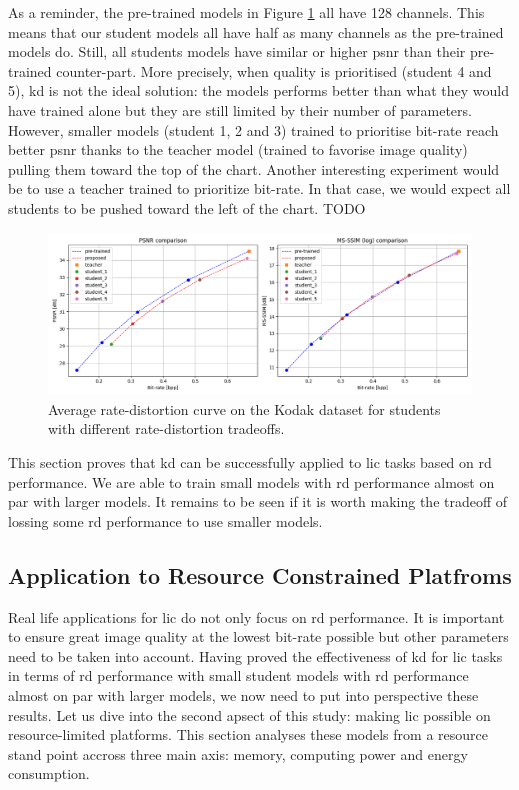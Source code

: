 As a reminder, the pre-trained models in Figure \ref{kd_lic_4} all have 128 channels. This means that our student models all have half as many channels as the pre-trained models do. Still, all students models have similar or higher \acrshort{psnr} than their pre-trained counter-part. More precisely, when quality is prioritised (student 4 and 5), \acrshort{kd} is not the ideal solution: the models performs better than what they would have trained alone but they are still limited by their number of parameters. However, smaller models (student 1, 2 and 3) trained to prioritise bit-rate reach better \acrshort{psnr} thanks to the teacher model (trained to favorise image quality) pulling them toward the top of the chart. Another interesting experiment would be to use a teacher trained to prioritize bit-rate. In that case, we would expect all students to be pushed toward the left of the chart. TODO

\begin{figure}
    \centering
    \includegraphics[width=15cm]{img/kd_lic_rd_lambda_1.png}
    \caption[Average rate-distortion curve on the Kodak dataset for students with different rate-distortion tradeoffs.]{Average rate-distortion curve on the Kodak dataset for students with different rate-distortion tradeoffs.}
    \label{kd_lic_4}
\end{figure}

This section proves that \acrshort{kd} can be successfully applied to \acrshort{lic} tasks based on \acrshort{rd} performance. We are able to train small models with \acrshort{rd} performance almost on par with larger models. It remains to be seen if it is worth making the tradeoff of lossing some \acrshort{rd} performance to use smaller models.

\subsection{Application to Resource Constrained Platfroms}
Real life applications for \acrshort{lic} do not only focus on \acrshort{rd} performance. It is important to ensure great image quality at the lowest bit-rate possible but other parameters need to be taken into account. Having proved the effectiveness of \acrshort{kd} for \acrshort{lic} tasks in terms of \acrshort{rd} performance with small student models with \acrshort{rd} performance almost on par with larger models, we now need to put into perspective these results. Let us dive into the second apsect of this study: making \acrshort{lic} possible on resource-limited platforms. This section analyses these models from a resource stand point accross three main axis: memory, computing power and energy consumption.

